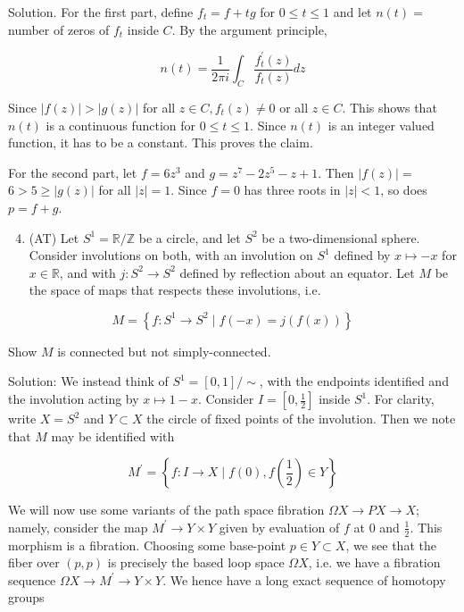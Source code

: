 \documentclass[10pt]{article}
\begin{document}
Solution. For the first part, define $f_{t}=f+t g$ for $0 \leq t \leq 1$ and let $n(t)=$ number of zeros of $f_{t}$ inside $C$. By the argument principle,

$$
n(t)=\frac{1}{2 \pi i} \int_{C} \frac{f_{t}^{\prime}(z)}{f_{t}(z)} d z
$$

Since $|f(z)|>|g(z)|$ for all $z \in C, f_{t}(z) \neq 0$ or all $z \in C$. This shows that $n(t)$ is a continuous function for $0 \leq t \leq 1$. Since $n(t)$ is an integer valued function, it has to be a constant. This proves the claim.

For the second part, let $f=6 z^{3}$ and $g=z^{7}-2 z^{5}-z+1$. Then $|f(z)|=$ $6>5 \geq|g(z)|$ for all $|z|=1$. Since $f=0$ has three roots in $|z|<1$, so does $p=f+g$.

\begin{enumerate}
  \setcounter{enumi}{3}
  \item (AT) Let $S^{1}=\mathbb{R} / \mathbb{Z}$ be a circle, and let $S^{2}$ be a two-dimensional sphere. Consider involutions on both, with an involution on $S^{1}$ defined by $x \mapsto-x$ for $x \in \mathbb{R}$, and with $j: S^{2} \rightarrow S^{2}$ defined by reflection about an equator. Let $M$ be the space of maps that respects these involutions, i.e.
\end{enumerate}

$$
M=\left\{f: S^{1} \rightarrow S^{2} \mid f(-x)=j(f(x))\right\}
$$

Show $M$ is connected but not simply-connected.

Solution: We instead think of $S^{1}=[0,1] / \sim$, with the endpoints identified and the involution acting by $x \mapsto 1-x$. Consider $I=\left[0, \frac{1}{2}\right]$ inside $S^{1}$. For clarity, write $X=S^{2}$ and $Y \subset X$ the circle of fixed points of the involution. Then we note that $M$ may be identified with

$$
M^{\prime}=\left\{f: I \rightarrow X \mid f(0), f\left(\frac{1}{2}\right) \in Y\right\}
$$

We will now use some variants of the path space fibration $\Omega X \rightarrow P X \rightarrow X$; namely, consider the map $M^{\prime} \rightarrow Y \times Y$ given by evaluation of $f$ at 0 and $\frac{1}{2}$. This morphism is a fibration. Choosing some base-point $p \in Y \subset X$, we see
that the fiber over $(p, p)$ is precisely the based loop space $\Omega X$, i.e. we have a fibration sequence $\Omega X \rightarrow M^{\prime} \rightarrow Y \times Y$. We hence have a long exact sequence of homotopy groups
\end{document}
